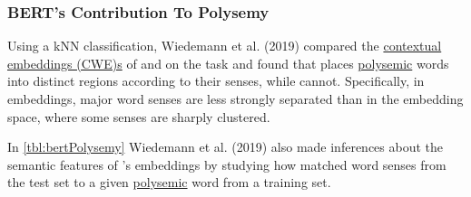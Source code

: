 \subsubsection{BERT's Contribution To Polysemy} %

Using a kNN classification, Wiedemann et al. (2019) compared the \hyperref[sec:SolutionWithContextEmbs]{contextual embeddings (CWE)s} of  and  on the  task and found that  places \hyperref[sec:Polysemy]{polysemic} words into distinct regions according to their senses, while  cannot. Specifically, in  embeddings, major word senses are less strongly separated than in the  embedding space, where some senses are sharply clustered. 

In \cref{tbl:bertPolysemy} Wiedemann et al. (2019) also made inferences about the semantic features of 's embeddings by studying how  matched word senses from the test set to a given \hyperref[sec:Polysemy]{polysemic} word from a training set.



